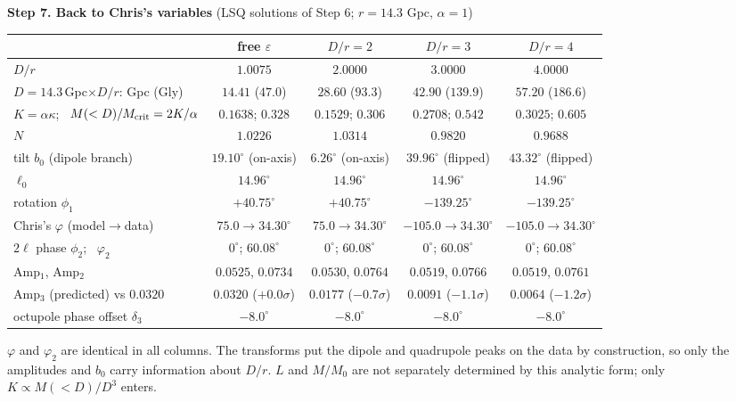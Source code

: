 \documentclass[10pt]{article}
\begin{document}
\medskip\textbf{Step 7. Back to Chris's variables} (LSQ solutions of Step 6; $r=14.3$ Gpc, $\alpha=1$)
\begin{center}\small
\begin{tabular}{lcccc}\toprule
 & free $\varepsilon$ & $D/r=2$ & $D/r=3$ & $D/r=4$\\\midrule

$D/r$ & $1.0075$ & $2.0000$ & $3.0000$ & $4.0000$\\
$D=14.3\,$Gpc$\times D/r$: Gpc (Gly) & $14.41$ ($47.0$) & $28.60$ ($93.3$) & $42.90$ ($139.9$) & $57.20$ ($186.6$)\\
$K=\alpha\kappa$; \ $M(<D)/M_{\rm crit}=2K/\alpha$ & $0.1638$; $0.328$ & $0.1529$; $0.306$ & $0.2708$; $0.542$ & $0.3025$; $0.605$\\
$N$ & $1.0226$ & $1.0314$ & $0.9820$ & $0.9688$\\
tilt $b_0$ (dipole branch) & $19.10^\circ$ (on-axis) & $6.26^\circ$ (on-axis) & $39.96^\circ$ (flipped) & $43.32^\circ$ (flipped)\\
$\ell_0$ & $14.96^\circ$ & $14.96^\circ$ & $14.96^\circ$ & $14.96^\circ$\\
rotation $\phi_1$ & $+40.75^\circ$ & $+40.75^\circ$ & $-139.25^\circ$ & $-139.25^\circ$\\
Chris's $\varphi$ (model$\to$data) & $75.0\to34.30^\circ$ & $75.0\to34.30^\circ$ & $-105.0\to34.30^\circ$ & $-105.0\to34.30^\circ$\\
$2\ell$ phase $\phi_2$; \ $\varphi_2$ & $0^\circ$; $60.08^\circ$ & $0^\circ$; $60.08^\circ$ & $0^\circ$; $60.08^\circ$ & $0^\circ$; $60.08^\circ$\\
Amp$_1$, Amp$_2$ & $0.0525$, $0.0734$ & $0.0530$, $0.0764$ & $0.0519$, $0.0766$ & $0.0519$, $0.0761$\\
Amp$_3$ (predicted) vs $0.0320$ & $0.0320$ ($+0.0\sigma$) & $0.0177$ ($-0.7\sigma$) & $0.0091$ ($-1.1\sigma$) & $0.0064$ ($-1.2\sigma$)\\
octupole phase offset $\delta_3$ & $-8.0^\circ$ & $-8.0^\circ$ & $-8.0^\circ$ & $-8.0^\circ$\\
\bottomrule
\end{tabular}
\end{center}
$\varphi$ and $\varphi_2$ are identical in all columns. The transforms put the dipole and quadrupole peaks on the data by construction, so only the amplitudes and $b_0$ carry information about $D/r$.
$L$ and $M/M_0$ are not separately determined by this analytic form; only $K\propto M(<D)/D^3$ enters.
\end{document}
